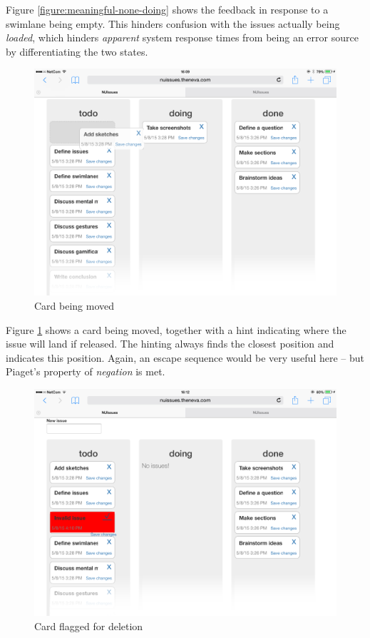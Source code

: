 Figure \ref{figure:meaningful-none-doing} shows the feedback in response to a swimlane being empty. This hinders confusion with the issues actually being \textit{loaded}, which hinders \textit{apparent} system response times from being an error source by differentiating the two states.

\begin{figure}[H]
    \centerline{\includegraphics[scale=0.4]{images/nuissues-screenshots/03-dragging-issue}}
    \caption{Card being moved}
    \label{figure:meaningful-card-moving}
\end{figure}

Figure \ref{figure:meaningful-card-moving} shows a card being moved, together with a hint indicating where the issue will land if released. The hinting always finds the closest position and indicates this position. Again, an escape sequence would be very useful here -- but Piaget's property of \textit{negation} is met.

\begin{figure}[H]
    \centerline{\includegraphics[scale=0.4]{images/nuissues-screenshots/07-invalid-issue-flagged}}
    \caption{Card flagged for deletion}
    \label{figure:meaningful-card-flagged}
\end{figure}

